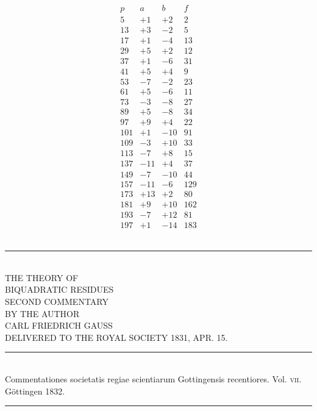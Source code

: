 \documentclass[twoside,12pt]{memoir}
\begin{document}
\[\begin{array}{r|r|r|r}
p & a & b & f \\
\hline
5 & +1 & +2 & 2 \\
13 & +3 & -2 & 5 \\
17 & +1& -4 & 13 \\
29 & +5 & +2 & 12 \\
37 & +1 & -6 & 31 \\
41 & +5 & +4 & 9 \\
53 & -7 & -2 & 23 \\
61 & +5 & -6 & 11 \\
73 & -3 & -8 & 27 \\
89 & +5 & -8 & 34 \\
97 & +9 & +4 & 22 \\
101 & +1 & -10 & 91 \\
109 & -3 & +10 & 33 \\
113 & -7 & +8 & 15 \\
137 & -11 & +4 & 37 \\
149 & -7 & -10 & 44 \\
157 & -11 & -6 & 129 \\
173 & +13 & +2 & 80 \\
181 & +9 & +10 & 162 \\
193 & -7 & +12 & 81 \\
197 & +1 & -14 & 183 
\end{array}\]\\[\baselineskip]
\begin{center} 
\rule{2in}{0.5pt}
\end{center}
\clearpage\noindent
%

\begin{center}
\;\\[4\baselineskip]
{\large THE THEORY OF}\\[\baselineskip]
{\LARGE BIQUADRATIC RESIDUES}\\[3\baselineskip]
{\large SECOND COMMENTARY}\\[2.5\baselineskip]
{\tiny BY THE AUTHOR}\\[1.5\baselineskip]
CARL FRIEDRICH GAUSS\\[1.5\baselineskip]
{\scriptsize DELIVERED TO THE ROYAL SOCIETY {\tiny \textsc{1831},} APR. {\tiny \textsc{15}.}}\\[4\baselineskip]
\rule{4in}{0.5pt}\\[0.5\baselineskip]
{\small Commentationes societatis regiae scientiarum Gottingensis recentiores. Vol. \textsc{vii}.\\
Göttingen \textsc{1832}.}\\
\rule{4in}{0.5pt}
\end{center}
\clearpage\noindent
\end{document}
